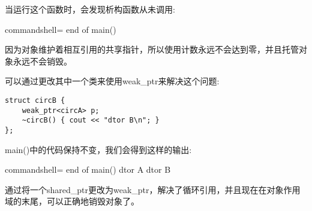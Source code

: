 当运行这个函数时，会发现析构函数从未调用:

\begin{tcblisting}{commandshell={}}
end of main()
\end{tcblisting}

因为对象维护着相互引用的共享指针，所以使用计数永远不会达到零，并且托管对象永远不会销毁。

可以通过更改其中一个类来使用weak\_ptr来解决这个问题:

\begin{lstlisting}[style=styleCXX]
struct circB {
	weak_ptr<circA> p;
	~circB() { cout << "dtor B\n"; }
};
\end{lstlisting}

main()中的代码保持不变，我们会得到这样的输出:

\begin{tcblisting}{commandshell={}}
end of main()
dtor A
dtor B
\end{tcblisting}

通过将一个shared\_ptr更改为weak\_ptr，解决了循环引用，并且现在在对象作用域的末尾，可以正确地销毁对象了。








